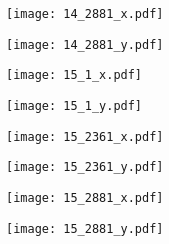 \documentclass[8pt]{beamer}
\begin{document}
\begin{frame}
\center
\texttt{[image: 14\_2881\_x.pdf]}
\end{frame}
\begin{frame}
\center
\texttt{[image: 14\_2881\_y.pdf]}
\end{frame}
\begin{frame}
\center
\texttt{[image: 15\_1\_x.pdf]}
\end{frame}
\begin{frame}
\center
\texttt{[image: 15\_1\_y.pdf]}
\end{frame}
\begin{frame}
\center
\texttt{[image: 15\_2361\_x.pdf]}
\end{frame}
\begin{frame}
\center
\texttt{[image: 15\_2361\_y.pdf]}
\end{frame}
\begin{frame}
\center
\texttt{[image: 15\_2881\_x.pdf]}
\end{frame}
\begin{frame}
\center
\texttt{[image: 15\_2881\_y.pdf]}
\end{frame}
\end{document}
